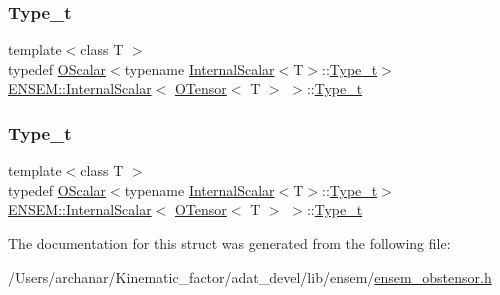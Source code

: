 \subsubsection{\texorpdfstring{Type\_t}{Type\_t}\hspace{0.1cm}{\footnotesize\ttfamily [1/2]}}
{\footnotesize\ttfamily template$<$class T $>$ \\
typedef \mbox{\hyperlink{classENSEM_1_1OScalar}{O\+Scalar}}$<$typename \mbox{\hyperlink{structENSEM_1_1InternalScalar}{Internal\+Scalar}}$<$T$>$\+::\mbox{\hyperlink{structENSEM_1_1InternalScalar_3_01OTensor_3_01T_01_4_01_4_a3f6b2482642650ffa201bbe320aaa7aa}{Type\+\_\+t}}$>$ \mbox{\hyperlink{structENSEM_1_1InternalScalar}{E\+N\+S\+E\+M\+::\+Internal\+Scalar}}$<$ \mbox{\hyperlink{classENSEM_1_1OTensor}{O\+Tensor}}$<$ T $>$ $>$\+::\mbox{\hyperlink{structENSEM_1_1InternalScalar_3_01OTensor_3_01T_01_4_01_4_a3f6b2482642650ffa201bbe320aaa7aa}{Type\+\_\+t}}}

\mbox{\label{structENSEM_1_1InternalScalar_3_01OTensor_3_01T_01_4_01_4_a3f6b2482642650ffa201bbe320aaa7aa}} 
\subsubsection{\texorpdfstring{Type\_t}{Type\_t}\hspace{0.1cm}{\footnotesize\ttfamily [2/2]}}
{\footnotesize\ttfamily template$<$class T $>$ \\
typedef \mbox{\hyperlink{classENSEM_1_1OScalar}{O\+Scalar}}$<$typename \mbox{\hyperlink{structENSEM_1_1InternalScalar}{Internal\+Scalar}}$<$T$>$\+::\mbox{\hyperlink{structENSEM_1_1InternalScalar_3_01OTensor_3_01T_01_4_01_4_a3f6b2482642650ffa201bbe320aaa7aa}{Type\+\_\+t}}$>$ \mbox{\hyperlink{structENSEM_1_1InternalScalar}{E\+N\+S\+E\+M\+::\+Internal\+Scalar}}$<$ \mbox{\hyperlink{classENSEM_1_1OTensor}{O\+Tensor}}$<$ T $>$ $>$\+::\mbox{\hyperlink{structENSEM_1_1InternalScalar_3_01OTensor_3_01T_01_4_01_4_a3f6b2482642650ffa201bbe320aaa7aa}{Type\+\_\+t}}}



The documentation for this struct was generated from the following file\+:\begin{DoxyCompactItemize}
\item 
/\+Users/archanar/\+Kinematic\+\_\+factor/adat\+\_\+devel/lib/ensem/\mbox{\hyperlink{lib_2ensem_2ensem__obstensor_8h}{ensem\+\_\+obstensor.\+h}}\end{DoxyCompactItemize}
